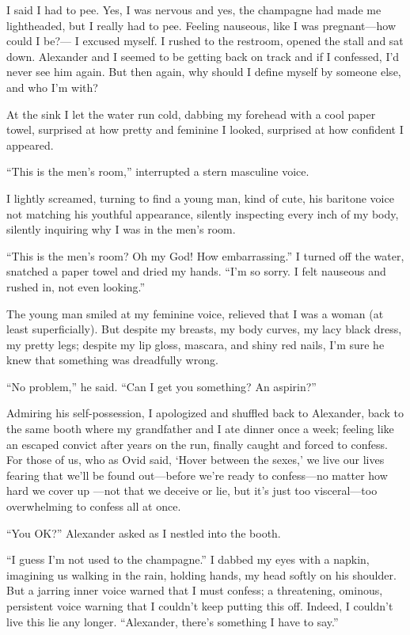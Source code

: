 I said I had to pee. Yes, I was nervous and yes, the champagne had made
me lightheaded, but I really had to pee. Feeling nauseous, like I was
pregnant---how could I be?--- I excused myself. I rushed to the
restroom, opened the stall and sat down. Alexander and I seemed to be
getting back on track and if I confessed, I'd never see him again. But
then again, why should I define myself by someone else, and who I'm
with?

At the sink I let the water run cold, dabbing my forehead with a cool
paper towel, surprised at how pretty and feminine I looked, surprised at
how confident I appeared.

``This is the men's room,'' interrupted a stern masculine voice.

I lightly screamed, turning to find a young man, kind of cute, his
baritone voice not matching his youthful appearance, silently inspecting
every inch of my body, silently inquiring why I was in the men's room.

``This is the men's room? Oh my God! How embarrassing.'' I turned off
the water, snatched a paper towel and dried my hands. ``I'm so sorry. I
felt nauseous and rushed in, not even looking.''

The young man smiled at my feminine voice, relieved that I was a woman
(at least superficially). But despite my breasts, my body curves, my
lacy black dress, my pretty legs; despite my lip gloss, mascara, and
shiny red nails, I'm sure he knew that something was dreadfully wrong.

``No problem,'' he said. ``Can I get you something? An aspirin?'' ~

Admiring his self-possession, I apologized and shuffled back to
Alexander, back to the same booth where my grandfather and I ate dinner
once a week; feeling like an escaped convict after years on the run,
finally caught and forced to confess. For those of us, who as Ovid said,
`Hover between the sexes,' we live our lives fearing that we'll be found
out---before we're ready to confess---no matter how hard we cover up
---not that we deceive or lie, but it's just too visceral---too
overwhelming to confess all at once.

``You OK?'' Alexander asked as I nestled into the booth.

``I guess I'm not used to the champagne.'' I dabbed my eyes with a
napkin, imagining us walking in the rain, holding hands, my head softly
on his shoulder. But a jarring inner voice warned that I must confess; a
threatening, ominous, persistent voice warning that I couldn't keep
putting this off. Indeed, I couldn't live this lie any longer.
``Alexander, there's something I have to say.''

